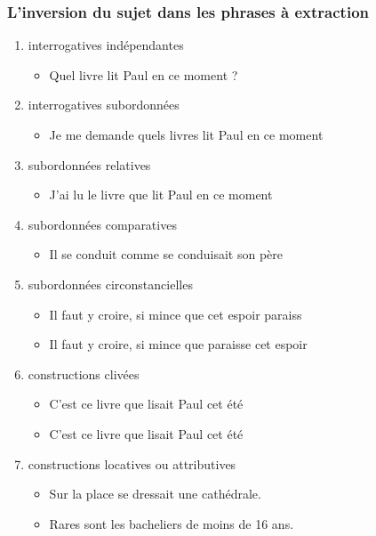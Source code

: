 \documentclass[UTF8]{report}
\begin{document}
\subsubsection{L’inversion du sujet dans les phrases à extraction}


\begin{enumerate}
    \item interrogatives indépendantes
    \begin{itemize}
        \item Quel livre lit Paul en ce moment ?
    \end{itemize}
    \item interrogatives subordonnées
    \begin{itemize}
        \item Je me demande quels livres lit Paul en ce moment
    \end{itemize}
    \item subordonnées relatives
    \begin{itemize}
        \item J’ai lu le livre que lit Paul en ce moment
    \end{itemize}
    \item subordonnées comparatives
    \begin{itemize}
        \item Il se conduit comme se conduisait son père
    \end{itemize}
    \item subordonnées circonstancielles
    \begin{itemize}
        \item Il faut y croire, si mince que cet espoir paraiss
        \item Il faut y croire, si mince que paraisse cet espoir
    \end{itemize}
    \item constructions clivées
    \begin{itemize}
        \item C’est ce livre que lisait Paul cet été
        \item C’est ce livre que lisait Paul cet été
    \end{itemize}
    \item constructions locatives ou attributives
    \begin{itemize}
        \item Sur la place se dressait une cathédrale.
        \item Rares sont les bacheliers de moins de 16 ans.

\end{itemize}
\end{enumerate}
\end{document}

